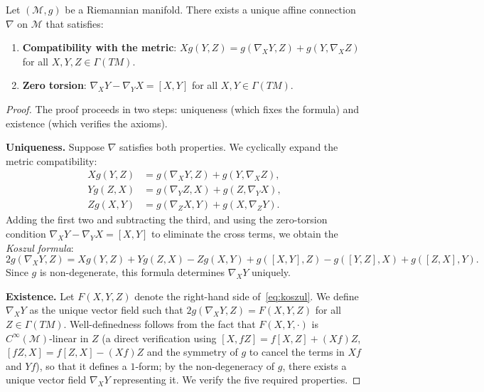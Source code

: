 \begin{theorem}\label{thm:existencia_levi_civita}
Let $(\mathcal{M}, g)$ be a Riemannian manifold. There exists a unique affine connection $\nabla$ on $\mathcal{M}$ that satisfies:
\begin{enumerate}
	\item \textbf{Compatibility with the metric}: $Xg(Y,Z) = g(\nabla_X Y, Z) + g(Y, \nabla_X Z)$ for all $X, Y, Z \in \Gamma(TM)$.
	\item \textbf{Zero torsion}: $\nabla_X Y - \nabla_Y X = [X,Y]$ for all $X, Y \in \Gamma(TM)$.
\end{enumerate}
\end{theorem}

\begin{proof}
The proof proceeds in two steps: uniqueness (which fixes the formula) and existence (which verifies the axioms).

\textbf{Uniqueness.} Suppose $\nabla$ satisfies both properties. We cyclically expand the metric compatibility:
\begin{align*}
Xg(Y,Z) &= g(\nabla_X Y, Z) + g(Y, \nabla_X Z), \\
Yg(Z,X) &= g(\nabla_Y Z, X) + g(Z, \nabla_Y X), \\
Zg(X,Y) &= g(\nabla_Z X, Y) + g(X, \nabla_Z Y).
\end{align*}
Adding the first two and subtracting the third, and using the zero-torsion condition $\nabla_X Y - \nabla_Y X = [X,Y]$ to eliminate the cross terms, we obtain the \textit{Koszul formula}:
\begin{equation}\label{eq:koszul}
2g(\nabla_X Y, Z) = Xg(Y,Z) + Yg(Z,X) - Zg(X,Y) + g([X,Y],Z) - g([Y,Z],X) + g([Z,X],Y).
\end{equation}
Since $g$ is non-degenerate, this formula determines $\nabla_X Y$ uniquely.

\textbf{Existence.} Let $F(X,Y,Z)$ denote the right-hand side of~\eqref{eq:koszul}. We define $\nabla_X Y$ as the unique vector field such that $2g(\nabla_X Y, Z) = F(X,Y,Z)$ for all $Z \in \Gamma(TM)$. Well-definedness follows from the fact that $F(X,Y,\cdot)$ is $C^\infty(\mathcal{M})$-linear in $Z$ (a direct verification using $[X, fZ] = f[X,Z] + (Xf)Z$, $[fZ, X] = f[Z,X] - (Xf)Z$ and the symmetry of $g$ to cancel the terms in $Xf$ and $Yf$), so that it defines a $1$-form; by the non-degeneracy of $g$, there exists a unique vector field $\nabla_X Y$ representing it. We verify the five required properties.


\end{proof}
